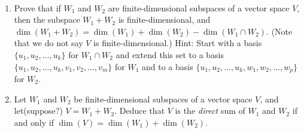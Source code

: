 \begin{exercise} \label{exercise 1.6.29} \ 

\begin{enumerate}
\item Prove that if \(W_1\) and \(W_2\) are finite-dimensional subspaces of a vector space \(V\), then  the subspace \(W_1 + W_2\) is finite-dimensional,  and \(\dim(W_1 + W_2) = \dim(W_1) + \dim(W_2) - \dim(W_1 \cap W_2)\).
(Note that we do not say \(V\) is finite-dimensional.)
Hint: Start with a basis \(\{ u_1, u_2, ..., u_k \}\) for \(W_1 \cap W_2\) and extend this set to a basis \(\{ u_1, u_2, ..., u_k, v_1, v_2, ..., v_m \}\) for \(W_1\) and to a basis \(\{ u_1, u_2, ..., u_k, w_1, w_2, ..., w_p \}\) for \(W_2\).
\item Let \(W_1\) and \(W_2\) be finite-dimensional subspaces of a vector space \(V\), and let(suppose?) \(V = W_1 + W_2\). 
Deduce that \(V\) is the \emph{direct} sum of \(W_1\)
and \(W_2\) if and only if \(\dim(V) = \dim(W_1) + \dim(W_2)\).
\end{enumerate}
\end{exercise}

